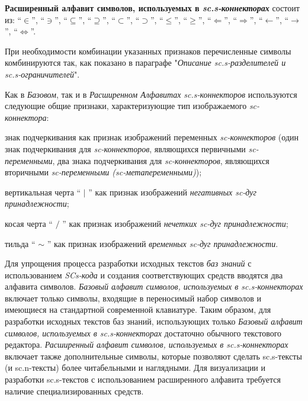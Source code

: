 \textbf{Расширенный алфавит символов, используемых в \textit{sc.s-коннекторах}\scnsupergroupsign} состоит из:
	``$\in$''{}, 
	``$\ni$''{}, ``$\subseteq$''{}, ``$\supseteq$''{},   ``$\subset$''{}, ``$\supset$''{}, ``$\leq$''{},  ``$\geq$''{}, ``$\Leftarrow$''{}, ``$\Rightarrow$''{}, ``$\leftarrow$''{}, ``$\rightarrow$''{}, 
	``$\Leftrightarrow$''{}.


При необходимости комбинации указанных признаков перечисленные символы комбинируются так, как показано в параграфе "\textit{Описание sc.s-разделителей и sc.s-ограничителей}"{}.

Как в \textit{Базовом}, так и в \textit{Расширенном Алфавитах} \textit{sc.s-коннекторов} используются следующие общие признаки, характеризующие тип изображаемого \textit{sc-коннектора}:
\begin{textitemize}
	\item знак подчеркивания как признак изображений переменных \textit{sc-коннекторов} (один знак подчеркивания для \textit{sc-коннекторов}, являющихся первичными \textit{sc-переменными}, два знака подчеркивания для \textit{sc-коннекторов}, являющихся вторичными \textit{sc-переменными (sc-метапеременными)});
	\item вертикальная черта `` $ | $ ''{} как признак изображений \textit{негативных sc-дуг принадлежности}; 
	\item косая черта `` $ / $ ''{} как признак изображений \textit{нечетких sc-дуг принадлежности};
	\item тильда `` $ \sim $ ''{} как признак изображений \textit{временных sc-дуг принадлежности}.   
\end{textitemize}

Для упрощения процесса разработки исходных текстов \textit{баз знаний} с использованием \textit{SCs-кода} и создания соответствующих средств вводятся два алфавита символов. \textit{Базовый алфавит символов, используемых в sc.s-коннекторах\scnsupergroupsign} включает только символы, входящие в переносимый набор символов и имеющиеся на стандартной современной клавиатуре. Таким образом, для разработки исходных текстов баз знаний, использующих только \textit{Базовый алфавит символов, используемых в sc.s-коннекторах\scnsupergroupsign} достаточно обычного текстового редактора. \textit{Расширенный алфавит символов, используемых в sc.s-коннекторах\scnsupergroupsign} включает также дополнительные символы, которые позволяют сделать sc.s-тексты (и sc.n-тексты) более читабельными и наглядными. Для визуализации и разработки sc.s-текстов с использованием расширенного алфавита требуется наличие специализированных средств.

